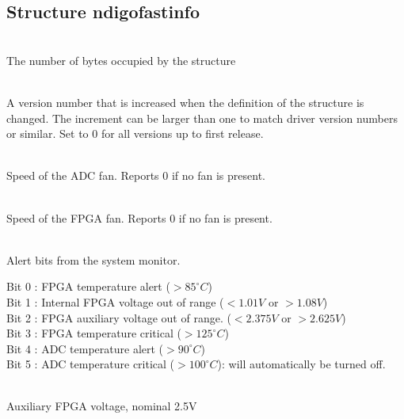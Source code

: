 
        \subsection{Structure ndigo\tu fast\tu info}

            \\
            The number of bytes occupied by the structure\par

            \\
            A version number that is increased when the definition of the structure is changed. The increment can be larger than one to match driver version numbers or similar. Set to 0 for all versions up to first release.\par

            \\
            Speed of the ADC fan. Reports 0 if no fan is present.\par

            \\
            Speed of the FPGA fan. Reports 0 if no fan is present.\par

            \\
            Alert bits from the system monitor.\par

            \noindent Bit 0 : FPGA temperature alert ($> 85^{\circ}C$)\\
            Bit 1 : Internal FPGA voltage out of range ($< 1.01V$ or $> 1.08V$)\\
            Bit 2 : FPGA auxiliary voltage out of range. ($< 2.375V$ or $>  2.625V$)\\
            Bit 3 : FPGA temperature critical ($> 125^{\circ}C$)\\
            Bit 4 : ADC temperature alert ($> 90^{\circ}C$)\\
            Bit 5 : ADC temperature critical ($> 100^{\circ}C$): will automatically be turned off.\par

            \\
            Auxiliary FPGA voltage, nominal 2.5V\par

